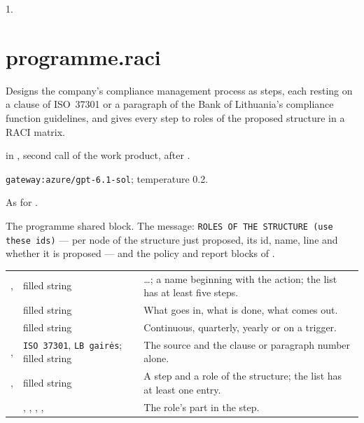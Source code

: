  1.


\section{programme.raci}\label{sec:aprompts:programme-raci}

 Designs the company's compliance management process as steps, each
resting on a clause of ISO~37301 or a paragraph of the Bank of Lithuania's compliance function
guidelines, and gives every step to roles of the proposed structure in a RACI matrix.

  in , second call of the
work product, after .

 \texttt{gateway:azure/gpt-6.1-sol}; temperature 0.2.

 As for .

 The programme shared block. The message:
\texttt{ROLES OF THE STRUCTURE (use these ids)} --- per node of the structure just proposed, its
id, name, line and whether it is proposed --- and the policy and report blocks of
.

\par\nopagebreak
\begin{xltabular}{\textwidth}{@{}L{40mm}L{30mm}Y@{}}
\toprule
{} &  &  \\
\midrule
\endhead
\bottomrule
\endlastfoot
{},  & filled string &  …; a name beginning with the action; the list has at least five steps. \\
 & filled string & What goes in, what is done, what comes out. \\
 & filled string & Continuous, quarterly, yearly or on a trigger. \\
,  & \texttt{ISO 37301}, \texttt{LB gairės}; filled string & The source and the clause or paragraph number alone. \\
,  & filled string & A step and a role of the structure; the list has at least one entry. \\
 & , , , ,  & The role's part in the step. \\
\end{xltabular}

